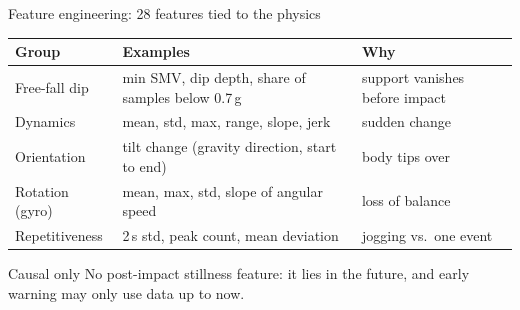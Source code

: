 \documentclass[aspectratio=169,11pt]{beamer}
\begin{document}
\begin{frame}{Feature engineering: 28 features tied to the physics}
\small
\begin{tabular}{@{}p{}p{}p{}@{}}
\toprule
\textbf{Group} & \textbf{Examples} & \textbf{Why}\\
\midrule
\alert{Free-fall dip} & min SMV, dip depth, share of samples below 0.7\,g & support vanishes before impact\\
Dynamics & mean, std, max, range, slope, jerk & sudden change\\
Orientation & tilt change (gravity direction, start to end) & body tips over\\
Rotation (gyro) & mean, max, std, slope of angular speed & loss of balance\\
Repetitiveness & 2\,s std, peak count, mean deviation & jogging vs.\ one event\\
\bottomrule
\end{tabular}
\vspace{0.8em}
\begin{alertblock}{Causal only}
No post-impact stillness feature: it lies in the future, and early warning may only use data up to now.
\end{alertblock}
\end{frame}
\end{document}
